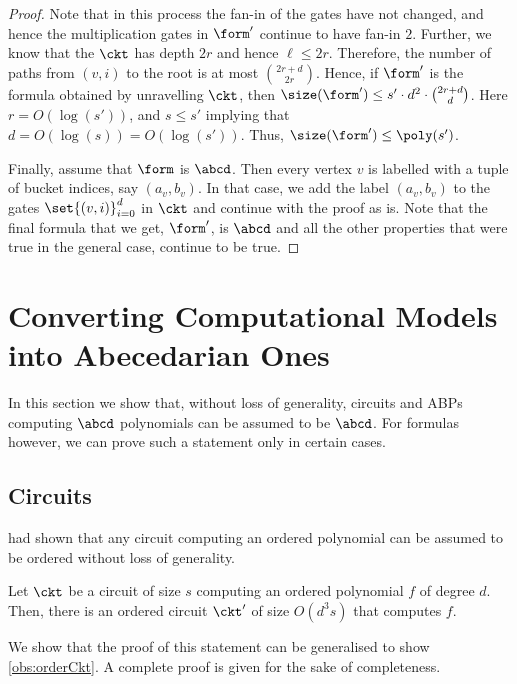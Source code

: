 \begin{proof}
	Note that in this process the fan-in of the gates have not changed, and hence the multiplication gates in $\form'$ continue to have fan-in $2$.
	Further, we know that the $\ckt$ has depth $2r$ and hence $\ell \leq 2r$. 
	Therefore, the number of paths from $(v, i)$ to the root is at most $2r + d \choose 2r$. 
	Hence, if $\form'$ is the formula obtained by unravelling $\ckt$, then $\size(\form') \leq s' \cdot d^2 \cdot {2r + d \choose d}$.	
	Here $r = O(\log(s'))$, and $s \leq s'$ implying that $d = O(\log(s)) = O(\log(s'))$.
	Thus, $\size(\form') \leq \poly(s')$.

	Finally, assume that $\form$ is $\abcd$.
	Then every vertex $v$ is labelled with a tuple of bucket indices, say $(a_v,b_v)$.
	In that case, we add the label $(a_v,b_v)$ to the gates $\set{(v,i)}_{i=0}^{d}$ in $\ckt$ and continue with the proof as is.
	Note that the final formula that we get, $\form'$, is $\abcd$ and all the other properties that were true in the general case, continue to be true.
\end{proof}

\section{Converting Computational Models into Abecedarian Ones}\label{sec:orderModels}

In this section we show that, without loss of generality, circuits and ABPs computing $\abcd$ polynomials can be assumed to be $\abcd$.
For formulas however, we can prove such a statement only in certain cases.

\subsection{Circuits}\label{sec:orderCkts}
{\Hrubes} {\etal} \cite{HWY11} had shown that any circuit computing an ordered polynomial can be assumed to be ordered without loss of generality. 

\begin{theoremwp}\label{thm:orderHomCkts}
	Let $\ckt$ be a circuit of size $s$ computing an ordered polynomial $f$ of degree $d$. 
	Then, there is an ordered circuit $\ckt'$ of size $O(d^3s)$ that computes $f$.
\end{theoremwp}

\noindent We show that the proof of this statement can be generalised to show \autoref{obs:orderCkt}. 
A complete proof is given for the sake of completeness.

